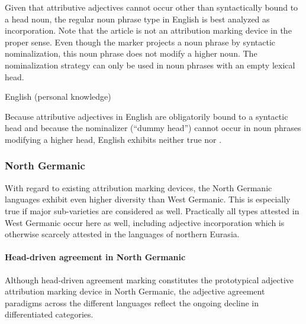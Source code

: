 Given that attributive adjectives cannot occur other than syntactically bound to a head noun, the regular noun phrase type in English is best analyzed as incorporation. Note that the article is not an attribution marking device in the proper sense. Even though the marker projects a noun phrase by syntactic nominalization, this noun phrase does not modify a higher noun. The nominalization strategy can only be used in noun phrases with an empty lexical head.
\begin{exe}
\ex \rm{English (personal knowledge)}
\begin{xlist}
\end{xlist}
\end{exe}
Because attributive adjectives in English are obligatorily bound to a syntactic head and because the nominalizer (“dummy head”) cannot occur in noun phrases modifying a higher head, English exhibits neither true  nor .

\subsubsection{North Germanic} \label{n-germanic synchr}
With regard to existing attribution marking devices, the North Germanic languages exhibit even higher diversity than West Germanic. This is especially true if major sub-varieties are considered as well. Practically all types attested in West Germanic occur here as well, including adjective incorporation which is otherwise scarcely attested in the languages of northern Eurasia.

\paragraph*{Head\hyp{}driven agreement in North Germanic} 
Although head\hyp{}driven agreement marking constitutes the prototypical adjective attribution marking device in North Germanic, the adjective agreement paradigms across the different languages reflect the ongoing decline in differentiated categories.

